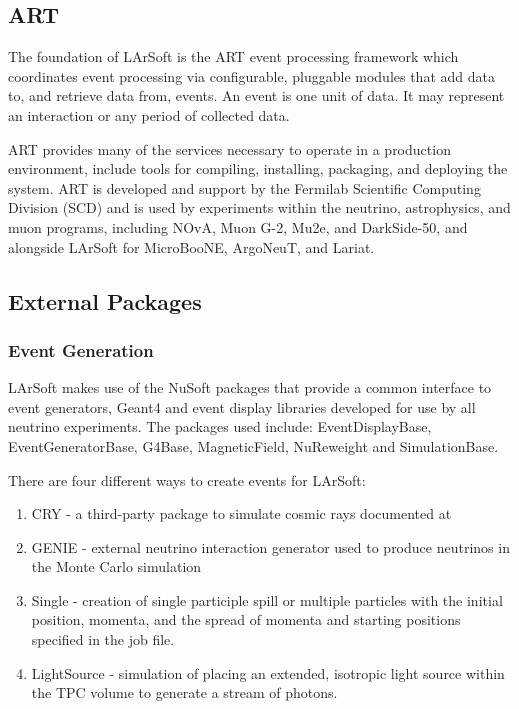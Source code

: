 \documentclass[12pt]{elsarticle}
\begin{document}
\subsection{ART}
The foundation of LArSoft is the ART event processing framework which coordinates event processing via configurable, pluggable modules that add data to, and retrieve data from, events.\cite{art-ref}  An event is one unit of data. It may represent an interaction or any period of collected data.

ART provides many of the services necessary to operate in a production environment, include tools for compiling, installing, packaging, and deploying the system.  ART is developed and support by the Fermilab Scientific Computing Division (SCD) and is used by experiments within the neutrino, astrophysics, and muon programs, including NOvA, Muon G-2, Mu2e, and DarkSide-50, and alongside LArSoft for MicroBooNE, ArgoNeuT, and Lariat.

\subsection{External Packages}
\subsubsection{Event Generation}
LArSoft makes use of the NuSoft packages that provide a common interface to event generators, Geant4 and event display libraries developed for use by all neutrino experiments. The packages used include:    EventDisplayBase, EventGeneratorBase, G4Base, MagneticField, NuReweight and SimulationBase.

There are four different ways to create events for LArSoft:
\begin{enumerate}
\item{CRY - a third-party package to simulate cosmic rays documented at \cite{cry}}
\item{GENIE - external neutrino interaction generator used to produce neutrinos in the Monte Carlo simulation}
\item{Single - creation of single participle spill or multiple particles with the initial position, momenta, and the spread of momenta and starting positions specified in the job file.}
\item{LightSource - simulation of placing an extended, isotropic light source within the TPC volume to generate a stream of photons.}
\end{enumerate}
\end{document}
